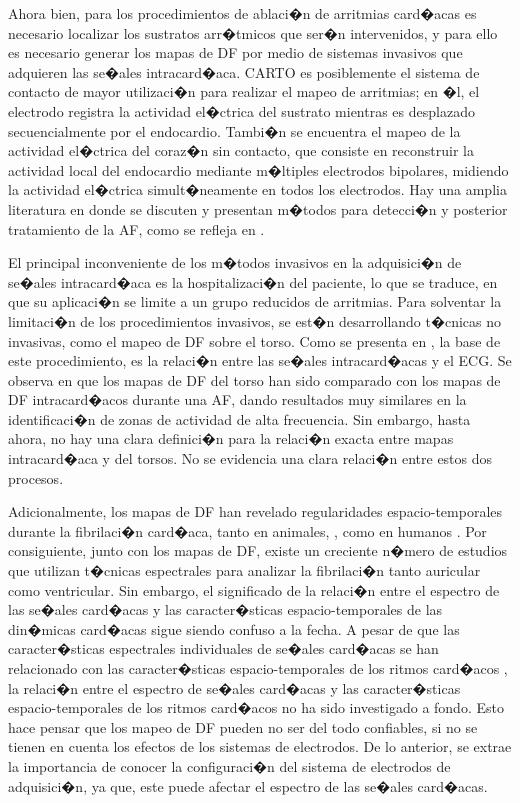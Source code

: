 Ahora bien, para los procedimientos de ablaci�n de arritmias card�acas es
necesario localizar los sustratos arr�tmicos que ser�n intervenidos, y para ello
es necesario generar los mapas de \ac{DF} por medio de sistemas invasivos que
adquieren las se�ales intracard�aca. CARTO \cite{gepstein1997} es posiblemente
el sistema de contacto de mayor utilizaci�n para realizar el mapeo de arritmias;
en �l, el electrodo registra la actividad el�ctrica del sustrato mientras es
desplazado secuencialmente por el endocardio.
Tambi�n se encuentra el mapeo de la actividad el�ctrica del coraz�n sin
contacto, que consiste en reconstruir la actividad local del endocardio mediante
m�ltiples electrodos bipolares, midiendo la actividad el�ctrica simult�neamente
en todos los electrodos. Hay una amplia literatura en donde se discuten y
presentan m�todos para detecci�n y posterior tratamiento de la \ac{AF}, como se
refleja en \cite{richter2011novel, kogawa2015effect}.


El principal inconveniente de los m�todos invasivos en la adquisici�n de se�ales
intracard�aca es la hospitalizaci�n del paciente, lo que se traduce, en que su
aplicaci�n se limite a un grupo reducidos de arritmias. Para solventar la
limitaci�n de los procedimientos invasivos, se est�n desarrollando t�cnicas no
invasivas, como el mapeo de \ac{DF} sobre el torso.  Como se presenta en
\cite{Richter08, Hsu08,Dibs08}, la base de este procedimiento, es la relaci�n
entre las se�ales intracard�acas y el \ac{ECG}.
Se observa en \cite{Guillem13, Guillem09} que los mapas de \ac{DF} del torso han
sido comparado con los mapas de \ac{DF} intracard�acos durante una \ac{AF},
dando resultados muy similares en la identificaci�n de zonas de actividad de
alta frecuencia. Sin embargo, hasta ahora, no hay una clara definici�n para la
relaci�n exacta entre mapas intracard�aca y del torsos.  No se evidencia una
clara relaci�n entre estos dos procesos.


Adicionalmente, los mapas de \ac{DF} han revelado regularidades
espacio-temporales durante la fibrilaci�n card�aca, tanto en animales,
\cite{Skanes98, Mandapati00, Mansour01}, como en humanos \cite{Sanders05,
Atienza06, atienza2009, Berenfeld11}. Por consiguiente, junto con los mapas de
\ac{DF}, existe un creciente n�mero de estudios que utilizan t�cnicas
espectrales para analizar la fibrilaci�n tanto auricular como ventricular. Sin
embargo, el significado de la relaci�n entre el espectro de las se�ales
card�acas  y las caracter�sticas espacio-temporales de las din�micas card�acas
sigue siendo confuso a la fecha. A pesar de que las caracter�sticas espectrales
individuales de se�ales card�acas se han relacionado con las caracter�sticas
espacio-temporales de los ritmos card�acos \cite{Fischer07, Ng07a, Zlochiver08},
la relaci�n entre el espectro de se�ales card�acas y las caracter�sticas
espacio-temporales de los ritmos card�acos no ha sido investigado a fondo. Esto
hace pensar que los mapeo de \ac{DF} pueden no ser del todo confiables, si no se
tienen en cuenta los efectos de los sistemas de electrodos.
De lo anterior, se extrae la importancia de conocer la configuraci�n del sistema
de electrodos de adquisici�n, ya que, este puede afectar el espectro de las
se�ales card�acas.

